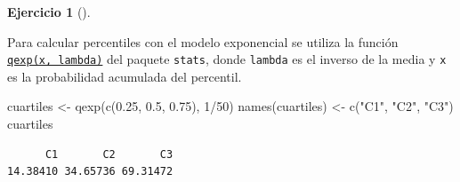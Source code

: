 \documentclass[
  a4paper,
]{scrreport}
\newenvironment{Shaded}{\begin{snugshade}}{\end{snugshade}}
\newcommand{\DecValTok}[1]{\textcolor[rgb]{0.68,0.00,0.00}{#1}}
\newcommand{\FloatTok}[1]{\textcolor[rgb]{0.68,0.00,0.00}{#1}}
\newcommand{\FunctionTok}[1]{\textcolor[rgb]{0.28,0.35,0.67}{#1}}
\newcommand{\NormalTok}[1]{\textcolor[rgb]{0.00,0.23,0.31}{#1}}
\newcommand{\OtherTok}[1]{\textcolor[rgb]{0.00,0.23,0.31}{#1}}
\newcommand{\SpecialCharTok}[1]{\textcolor[rgb]{0.37,0.37,0.37}{#1}}
\newcommand{\StringTok}[1]{\textcolor[rgb]{0.13,0.47,0.30}{#1}}
\theoremstyle{definition}
\newtheorem{exercise}{Ejercicio}[chapter]
\theoremstyle{remark}
\begin{document}
\begin{exercise}[]
\begin{enumerate}
\begin{tcolorbox}
  Para calcular percentiles con el modelo exponencial se utiliza la
  función
  \href{https://www.rdocumentation.org/packages/stats/versions/3.3/topics/Exponential}{\texttt{qexp(x,\ lambda)}}
  del paquete \texttt{stats}, donde \texttt{lambda} es el inverso de la
  media y \texttt{x} es la probabilidad acumulada del percentil.

\begin{Shaded}
\begin{Highlighting}[]
\NormalTok{cuartiles }\OtherTok{\textless{}{-}} \FunctionTok{qexp}\NormalTok{(}\FunctionTok{c}\NormalTok{(}\FloatTok{0.25}\NormalTok{, }\FloatTok{0.5}\NormalTok{, }\FloatTok{0.75}\NormalTok{), }\DecValTok{1}\SpecialCharTok{/}\DecValTok{50}\NormalTok{)}
\FunctionTok{names}\NormalTok{(cuartiles) }\OtherTok{\textless{}{-}} \FunctionTok{c}\NormalTok{(}\StringTok{"C1"}\NormalTok{, }\StringTok{"C2"}\NormalTok{, }\StringTok{"C3"}\NormalTok{)}
\NormalTok{cuartiles}
\end{Highlighting}
\end{Shaded}

\begin{verbatim}
      C1       C2       C3 
14.38410 34.65736 69.31472 
\end{verbatim}

  \end{tcolorbox}
\end{enumerate}

\end{exercise}
\end{document}
